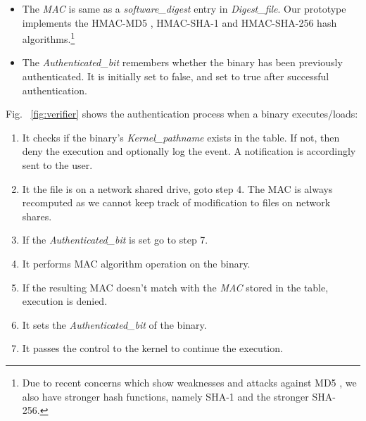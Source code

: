 \begin{itemize}
\item The {\it MAC} is same as a {\it software\_digest} entry in {\it Digest\_file}.
Our prototype implements the
HMAC-MD5 \cite{krawczyk1997rfc2104}, HMAC-SHA-1 
and HMAC-SHA-256 \cite{eastlake2006rfc4634} hash algorithms.\footnote{
Due to recent concerns which show weaknesses and attacks against MD5 \cite{wang2005break}, 
we also have stronger hash functions, namely SHA-1 and the stronger SHA-256.}
\item The {\it Authenticated\_bit} remembers whether the binary has
been previously authenticated.
It is initially set to false, and set to true after successful authentication.
\end{itemize}

\noindent
Fig. ~\ref{fig:verifier} shows the authentication process 
when a binary executes/loads:
\begin{enumerate}
\item It checks if the binary's {\it Kernel\_pathname} exists in the table.
If not, then deny the execution and optionally log the event.
A notification is accordingly sent to the user. 
\item It the file is on a network shared drive, goto step 4.
The MAC is always
recomputed as we cannot keep track of modification to files on network shares.
\item If the {\it Authenticated\_bit} is set go to step 7.
\item It performs MAC algorithm operation on the binary.
\item If the resulting MAC doesn't match with the 
{\it MAC} stored in the table, execution is denied.
\item It sets the {\it Authenticated\_bit} of the binary.
\item It passes the control to the kernel to continue the execution.
\end{enumerate}

